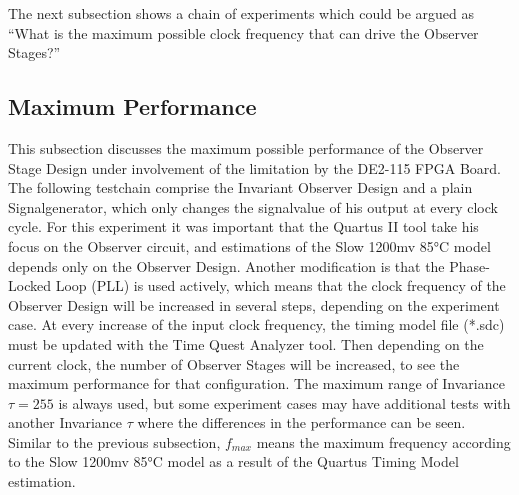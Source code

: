 The next subsection shows a chain of experiments which could be argued as ``What is the maximum possible clock frequency that can drive the Observer Stages?''

\subsection{Maximum Performance}
\label{chapter:4:section:3:subsection:2}
This subsection discusses the maximum possible performance of the Observer Stage Design under involvement of the limitation by the DE2-115 FPGA Board. 
The following testchain comprise the Invariant Observer Design and a plain Signalgenerator, which only changes the signalvalue of his output at every clock cycle. 
For this experiment it was important that the Quartus II tool take his focus on the Observer circuit, and estimations of the Slow 1200mv 85°C model depends 
only on the Observer Design.
Another modification is that the Phase-Locked Loop (PLL) is used actively, which means that the clock frequency of the Observer Design will be increased in several steps, 
depending on the experiment case. 
At every increase of the input clock frequency, the timing model file (*.sdc) must be updated with the Time Quest Analyzer tool. 
Then depending on the current clock, the number of Observer Stages will be increased, to see the maximum performance for that configuration. 
The maximum range of Invariance $\tau = 255$ is always used, but some experiment cases may have additional tests with another Invariance $\tau$ 
where the differences in the performance can be seen. 
Similar to the previous subsection, $f_{max}$ means the maximum frequency according to the Slow 1200mv 85°C model as a result of the Quartus Timing Model estimation. \\

